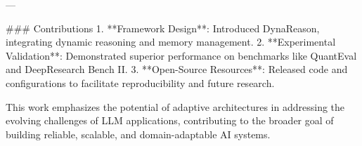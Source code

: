 ---

### Contributions  
1. **Framework Design**: Introduced DynaReason, integrating dynamic reasoning and memory management.  
2. **Experimental Validation**: Demonstrated superior performance on benchmarks like QuantEval and DeepResearch Bench II.  
3. **Open-Source Resources**: Released code and configurations to facilitate reproducibility and future research.  

This work emphasizes the potential of adaptive architectures in addressing the evolving challenges of LLM applications, contributing to the broader goal of building reliable, scalable, and domain-adaptable AI systems.
